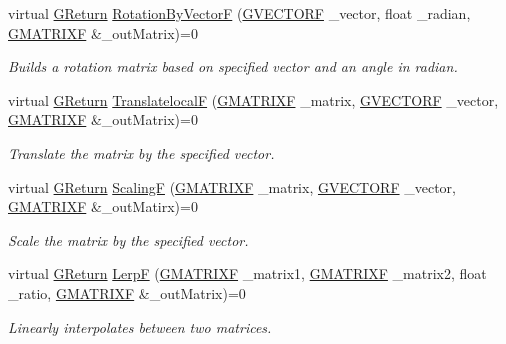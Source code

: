 \begin{DoxyCompactItemize}
virtual \hyperlink{namespaceGW_a67a839e3df7ea8a5c5686613a7a3de21}{G\+Return} \hyperlink{classGW_1_1MATH_1_1GMatrix_a2dded0d4aa97a7b6c1b885292a441574}{Rotation\+By\+VectorF} (\hyperlink{structGW_1_1MATH_1_1GVECTORF}{G\+V\+E\+C\+T\+O\+RF} \+\_\+vector, float \+\_\+radian, \hyperlink{structGW_1_1MATH_1_1GMATRIXF}{G\+M\+A\+T\+R\+I\+XF} \&\+\_\+out\+Matrix)=0
\begin{DoxyCompactList}\small\item\em Builds a rotation matrix based on specified vector and an angle in radian. \end{DoxyCompactList}\item 
virtual \hyperlink{namespaceGW_a67a839e3df7ea8a5c5686613a7a3de21}{G\+Return} \hyperlink{classGW_1_1MATH_1_1GMatrix_aee43c6ff9c28dbac026b529bef61c236}{TranslatelocalF} (\hyperlink{structGW_1_1MATH_1_1GMATRIXF}{G\+M\+A\+T\+R\+I\+XF} \+\_\+matrix, \hyperlink{structGW_1_1MATH_1_1GVECTORF}{G\+V\+E\+C\+T\+O\+RF} \+\_\+vector, \hyperlink{structGW_1_1MATH_1_1GMATRIXF}{G\+M\+A\+T\+R\+I\+XF} \&\+\_\+out\+Matrix)=0
\begin{DoxyCompactList}\small\item\em Translate the matrix by the specified vector. \end{DoxyCompactList}\item 
virtual \hyperlink{namespaceGW_a67a839e3df7ea8a5c5686613a7a3de21}{G\+Return} \hyperlink{classGW_1_1MATH_1_1GMatrix_a4342d54e82d03d18e493368e87e90137}{ScalingF} (\hyperlink{structGW_1_1MATH_1_1GMATRIXF}{G\+M\+A\+T\+R\+I\+XF} \+\_\+matrix, \hyperlink{structGW_1_1MATH_1_1GVECTORF}{G\+V\+E\+C\+T\+O\+RF} \+\_\+vector, \hyperlink{structGW_1_1MATH_1_1GMATRIXF}{G\+M\+A\+T\+R\+I\+XF} \&\+\_\+out\+Matirx)=0
\begin{DoxyCompactList}\small\item\em Scale the matrix by the specified vector. \end{DoxyCompactList}\item 
virtual \hyperlink{namespaceGW_a67a839e3df7ea8a5c5686613a7a3de21}{G\+Return} \hyperlink{classGW_1_1MATH_1_1GMatrix_a677534c072e7cb8d93223fdc05ae1957}{LerpF} (\hyperlink{structGW_1_1MATH_1_1GMATRIXF}{G\+M\+A\+T\+R\+I\+XF} \+\_\+matrix1, \hyperlink{structGW_1_1MATH_1_1GMATRIXF}{G\+M\+A\+T\+R\+I\+XF} \+\_\+matrix2, float \+\_\+ratio, \hyperlink{structGW_1_1MATH_1_1GMATRIXF}{G\+M\+A\+T\+R\+I\+XF} \&\+\_\+out\+Matrix)=0
\begin{DoxyCompactList}\small\item\em Linearly interpolates between two matrices. \end{DoxyCompactList}\item 

\end{DoxyCompactItemize}
